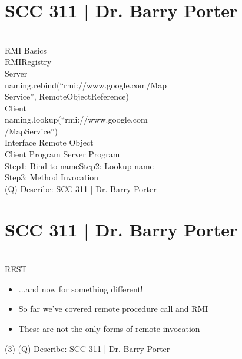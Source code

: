\documentclass[12pt]{article}
\begin{document}
\section{SCC 311 | Dr. Barry Porter}
\\
RMI Basics\\
RMIRegistry\\
Server\\
naming.rebind(“rmi://www.google.com/Map\\
Service”, RemoteObjectReference)\\
Client\\
naming.lookup(“rmi://www.google.com\\
/MapService”)\\
Interface Remote Object\\
Client Program Server Program\\
Step1: Bind to nameStep2: Lookup name\\
Step3: Method Invocation\\
\clearpage
(Q)
Describe: SCC 311 | Dr. Barry Porter
\clearpage
\section{SCC 311 | Dr. Barry Porter}
\\
REST\\
\begin{itemize}
  \item ...and now for something different!
  \item So far we've covered remote procedure call and RMI
  \item These are not the only forms of remote invocation
\end{itemize}(3)
\clearpage
(Q)
Describe: SCC 311 | Dr. Barry Porter
\clearpage
\end{document}
